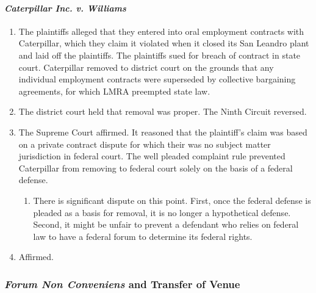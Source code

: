 \paragraph{\emph{Caterpillar Inc. v. Williams}}

\begin{enumerate}
    \item The plaintiffs alleged that they entered into oral employment 
    contracts with Caterpillar, which they claim it violated when it closed 
    its San Leandro plant and laid off the plaintiffs. The plaintiffs sued for 
    breach of contract in state court. Caterpillar removed to district court 
    on the grounds that any individual employment contracts were superseded by 
    collective bargaining agreements, for which LMRA preempted state law.
    \item The district court held that removal was proper. The Ninth Circuit 
    reversed.
    \item The Supreme Court affirmed. It reasoned that the plaintiff's claim 
    was based on a private contract dispute for which their was no subject 
    matter jurisdiction in federal court. The well pleaded complaint rule 
    prevented Caterpillar from removing to federal court solely on the basis 
    of a federal defense.
    \begin{enumerate}
        \item There is significant dispute on this point. First, once the 
        federal defense is pleaded as a basis for removal, it is no longer a 
        hypothetical defense. Second, it might be unfair to prevent a 
        defendant who relies on federal law to have a federal forum to 
        determine its federal rights.
    \end{enumerate}
    \item Affirmed.
\end{enumerate}

\subsubsection{\emph{Forum Non Conveniens} and Transfer of Venue}

